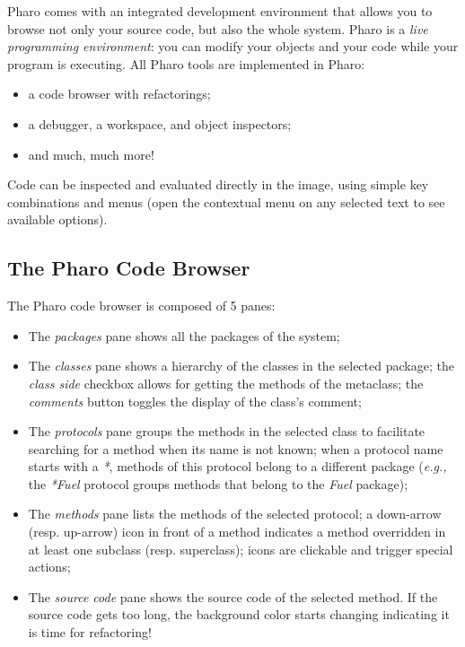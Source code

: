 \documentclass[notumble]{leaflet}
\newcommand{\eg}{\emph{e.g.,}\xspace}
\begin{document}
Pharo comes with an integrated development environment that allows you
to browse not only your source code, but also the whole system. Pharo
is a \emph{live programming environment}: you can modify your objects
and your code while your program is executing. All Pharo tools are
implemented in Pharo:
\begin{itemize}
\item a code browser with refactorings;
\item a debugger, a workspace, and object inspectors;
\item and much, much more!
\end{itemize}

Code can be inspected and evaluated directly in the image, using
simple key combinations and menus (open the contextual menu on any
selected text to see available options).


\subsection{The Pharo Code Browser}

The Pharo code browser is composed of 5 panes:

\begin{itemize}
\item The \emph{packages} pane shows all the packages of the system;
\item The \emph{classes} pane shows a hierarchy of the classes in the
  selected package; the \emph{class side} checkbox allows for getting
  the methods of the metaclass; the \emph{comments} button toggles the
  display of the class's comment;
\item The \emph{protocols} pane groups the methods in the selected
  class to facilitate searching for a method when its name is not
  known; when a protocol name starts with a \emph{*}, methods of this
  protocol belong to a different package (\eg the \emph{*Fuel}
  protocol groups methods that belong to the \emph{Fuel} package);
\item The \emph{methods} pane lists the methods of the selected
  protocol; a down-arrow (resp. up-arrow) icon in front of a method
  indicates a method overridden in at least one subclass (resp.
  superclass); icons are clickable and trigger special actions;
\item The \emph{source code} pane shows the source code of the
  selected method. If the source code gets too long, the background
  color starts changing indicating it is time for refactoring!
\end{itemize}
\end{document}
